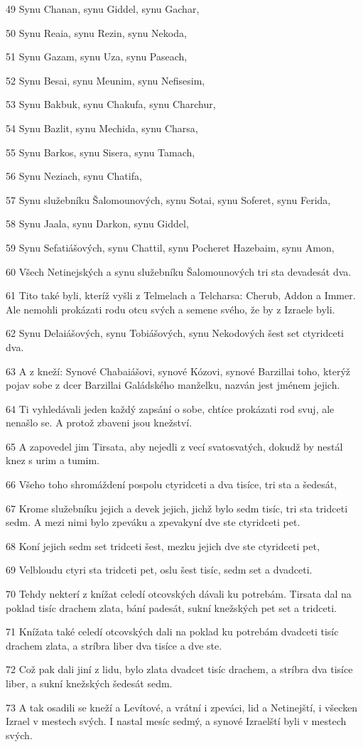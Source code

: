 \par 49 Synu Chanan, synu Giddel, synu Gachar,
\par 50 Synu Reaia, synu Rezin, synu Nekoda,
\par 51 Synu Gazam, synu Uza, synu Paseach,
\par 52 Synu Besai, synu Meunim, synu Nefisesim,
\par 53 Synu Bakbuk, synu Chakufa, synu Charchur,
\par 54 Synu Bazlit, synu Mechida, synu Charsa,
\par 55 Synu Barkos, synu Sisera, synu Tamach,
\par 56 Synu Neziach, synu Chatifa,
\par 57 Synu služebníku Šalomounových, synu Sotai, synu Soferet, synu Ferida,
\par 58 Synu Jaala, synu Darkon, synu Giddel,
\par 59 Synu Sefatiášových, synu Chattil, synu Pocheret Hazebaim, synu Amon,
\par 60 Všech Netinejských a synu služebníku Šalomounových tri sta devadesát dva.
\par 61 Tito také byli, kteríž vyšli z Telmelach a Telcharsa: Cherub, Addon a Immer. Ale nemohli prokázati rodu otcu svých a semene svého, že by z Izraele byli.
\par 62 Synu Delaiášových, synu Tobiášových, synu Nekodových šest set ctyridceti dva.
\par 63 A z kneží: Synové Chabaiášovi, synové Kózovi, synové Barzillai toho, kterýž pojav sobe z dcer Barzillai Galádského manželku, nazván jest jménem jejich.
\par 64 Ti vyhledávali jeden každý zapsání o sobe, chtíce prokázati rod svuj, ale nenašlo se. A protož zbaveni jsou knežství.
\par 65 A zapovedel jim Tirsata, aby nejedli z vecí svatosvatých, dokudž by nestál knez s urim a tumim.
\par 66 Všeho toho shromáždení pospolu ctyridceti a dva tisíce, tri sta a šedesát,
\par 67 Krome služebníku jejich a devek jejich, jichž bylo sedm tisíc, tri sta tridceti sedm. A mezi nimi bylo zpeváku a zpevakyní dve ste ctyridceti pet.
\par 68 Koní jejich sedm set tridceti šest, mezku jejich dve ste ctyridceti pet,
\par 69 Velbloudu ctyri sta tridceti pet, oslu šest tisíc, sedm set a dvadceti.
\par 70 Tehdy nekterí z knížat celedí otcovských dávali ku potrebám. Tirsata dal na poklad tisíc drachem zlata, bání padesát, sukní knežských pet set a tridceti.
\par 71 Knížata také celedí otcovských dali na poklad ku potrebám dvadceti tisíc drachem zlata, a stríbra liber dva tisíce a dve ste.
\par 72 Což pak dali jiní z lidu, bylo zlata dvadcet tisíc drachem, a stríbra dva tisíce liber, a sukní knežských šedesát sedm.
\par 73 A tak osadili se kneží a Levítové, a vrátní i zpeváci, lid a Netinejští, i všecken Izrael v mestech svých. I nastal mesíc sedmý, a synové Izraelští byli v mestech svých.

